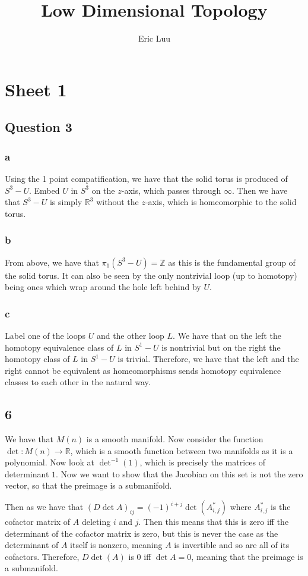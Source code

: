 \documentclass{article}
\title{Low Dimensional Topology}
\author{Eric Luu}
\theoremstyle{definition}
\numberwithin{theorem}{section}
\numberwithin{equation}{section}
\begin{document}
\section{Sheet 1}


\subsection{Question 3}

\subsubsection{a}
Using the 1 point compatification, we have that the solid torus is produced of $S^3 - U$. Embed $U$ in $S^3$ on the $z$-axis, which passes through $\infty$. Then we have that $S^3 - U$ is simply $\mathbb{R}^3$ without the $z$-axis, which is homeomorphic to the solid torus. 
\subsubsection{b}
From above, we have that $\pi_1(S^3 - U) = \mathbb{Z}$ as this is the fundamental group of the solid torus. It can also be seen by the only nontrivial loop (up to homotopy) being ones which wrap around the hole left behind by $U$. 
\subsubsection{c}
Label one of the loops $U$ and the other loop $L$. We have that on the left the homotopy equivalence class of $L$ in $S^1 - U$ is nontrivial but on the right the homotopy class of $L$ in $S^1 - U$ is trivial. Therefore, we have that the left and the right cannot be equivalent as homeomorphisms sends homotopy equivalence classes to each other in the natural way. 

\subsection{6}
We have that $M(n)$ is a smooth manifold. Now consider the function $\det : M(n) \rightarrow \mathbb{R}$, which is a smooth function between two manifolds as it is a polynomial. Now look at $\det^{-1} (1)$, which is precisely the matrices of determinant $1$. Now we want to show that the Jacobian on this set is not the zero vector, so that the preimage is a submanifold. 

Then as we have that $(D \det A)_{ij} = (-1)^{i + j} \det(A^*_{i, j})$ where $A^*_{i, j}$ is the cofactor matrix of $A$ deleting $i$ and $j$. Then this means that this is zero iff the determinant of the cofactor matrix is zero, but this is never the case as the determinant of $A$ itself is nonzero, meaning $A$ is invertible and so are all of its cofactors. Therefore, $D \det(A)$ is 0 iff $\det A = 0$, meaning that the preimage is a submanifold. 
\end{document}
